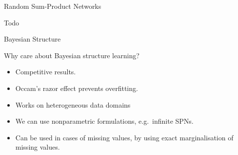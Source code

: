 \begin{frame}{Random Sum-Product Networks}{}

    Todo

\end{frame}

%

\begin{frame}{Bayesian Structure}
\begin{block}{Why care about Bayesian structure learning?}
\begin{itemize}
        \item Competitive results.
        \item Occam's razor effect prevents overfitting.
        \item Works on heterogeneous data domains
        \item We can use nonparametric formulations, e.g.~infinite SPNs.
        \item Can be used in cases of missing values, by using exact marginalisation of missing values.
    \end{itemize}
\end{block}
\end{frame}

